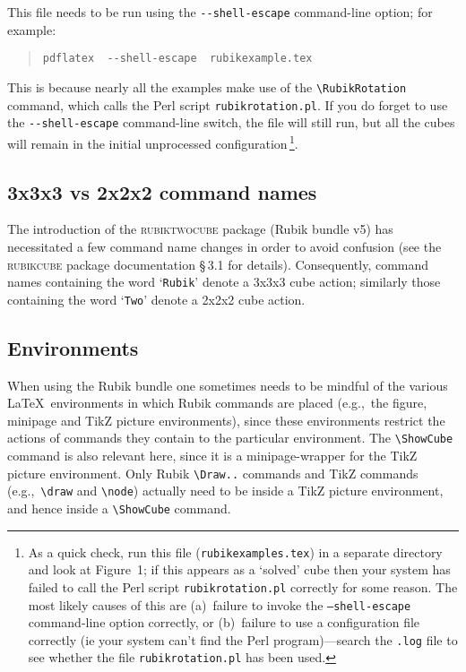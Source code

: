 \documentclass[a4paper]{article}
\begin{document}
This file needs to be run using  the \verb!--shell-escape! command-line option; 
for example:
\begin{quote}
\begin{verbatim}
pdflatex  --shell-escape  rubikexample.tex
\end{verbatim}
\end{quote}
This is because nearly all the examples  make use of the  \verb!\RubikRotation! 
command, which  calls the Perl script  \texttt{rubikrotation.pl}.  
If you do forget to use the \verb!--shell-escape!  command-line switch, 
the file will still run, but all the cubes will remain in the initial 
unprocessed configuration\,\footnote{As a quick check, run this file 
(\texttt{rubikexamples.tex}) in a separate directory and look at Figure~1; 
if this appears as a `solved' cube then your system has failed to call the Perl 
script \texttt{rubikrotation.pl} correctly for some reason. The most likely 
causes of this are (a)~failure to invoke the \texttt{--shell-escape}  command-line 
option correctly, or (b)~failure to use a configuration file correctly 
(ie your system can't find the Perl program)---search the \texttt{.log} file 
to see whether the file \texttt{rubikrotation.pl} has been used.}. 

\subsection{3x3x3 vs 2x2x2 command names}
The introduction of the  \textsc{rubiktwocube} package  (Rubik bundle v5)
has necessitated a few command name changes in order to avoid confusion 
(see the \textsc{rubikcube} package documentation \S\,3.1 for details). 
Consequently, command names containing the word `\texttt{Rubik}'  denote 
a 3x3x3 cube action; similarly those containing the word `\texttt{Two}'  
denote a 2x2x2 cube action. 

\subsection{Environments}
When using the Rubik bundle one sometimes needs to be mindful of the various 
\LaTeX\ environments in which Rubik commands are placed (e.g.,~the figure, 
minipage and TikZ picture environments), since these environments restrict 
the actions of commands they contain to the particular environment. 
The \verb!\ShowCube! command is also relevant here, since it is a 
minipage-wrapper for the TikZ picture environment. Only Rubik  \verb!\Draw..! 
commands and TikZ commands (e.g.,~\verb!\draw! and \verb!\node!) 
actually need to be inside a TikZ picture environment, and hence 
inside a \verb!\ShowCube! command. 
\end{document}
